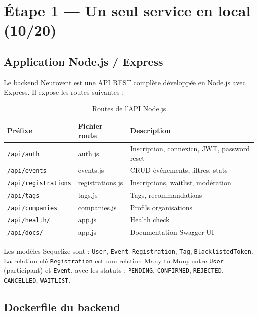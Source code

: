 \documentclass[12pt,a4paper]{article}
\begin{document}
\section{Étape 1 — Un seul service en local (10/20)}

\subsection{Application Node.js / Express}

Le backend Neurovent est une API REST complète développée en Node.js avec Express.
Il expose les routes suivantes :

\begin{table}[H]
  \centering
  \begin{tabularx}{\textwidth}{llX}
    \toprule
    \textbf{Préfixe} & \textbf{Fichier route} & \textbf{Description} \\
    \midrule
    \texttt{/api/auth}          & auth.js          & Inscription, connexion, JWT, password reset \\
    \texttt{/api/events}        & events.js        & CRUD événements, filtres, stats \\
    \texttt{/api/registrations} & registrations.js & Inscriptions, waitlist, modération \\
    \texttt{/api/tags}          & tags.js          & Tags, recommandations \\
    \texttt{/api/companies}     & companies.js     & Profils organisations \\
    \texttt{/api/health/}       & app.js           & Health check \\
    \texttt{/api/docs/}         & app.js           & Documentation Swagger UI \\
    \bottomrule
  \end{tabularx}
  \caption{Routes de l'API Node.js}
\end{table}

Les modèles Sequelize sont : \texttt{User}, \texttt{Event}, \texttt{Registration}, \texttt{Tag},
\texttt{BlacklistedToken}. La relation clé \texttt{Registration} est une relation Many-to-Many
entre \texttt{User} (participant) et \texttt{Event}, avec les statuts :
\texttt{PENDING}, \texttt{CONFIRMED}, \texttt{REJECTED}, \texttt{CANCELLED}, \texttt{WAITLIST}.

\subsection{Dockerfile du backend}
\end{document}
